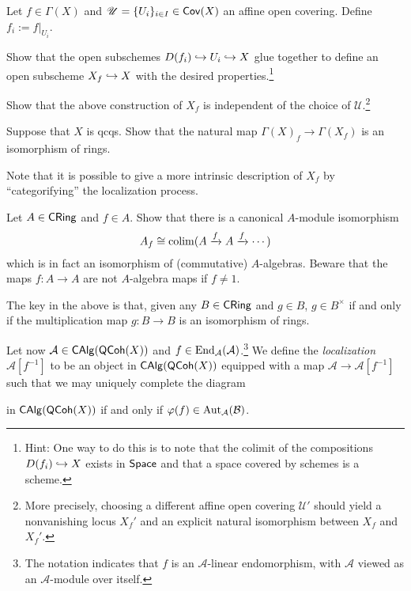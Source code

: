 \documentclass[11pt]{article}
\renewcommand{\AA}{\mathcal{A}}
\newcommand{\BB}{\mathcal{B}}
\renewcommand{\phi}{\varphi}
\newcommand{\U}{\mathscr{U}}
\begin{document}
\begin{exercise}
Let $f\in\Gamma(X)$ and $\U=\{U_i\}_{i\in I}\in\Cov(X)$ an affine open covering. Define $f_i:=f|_{U_i}$. 
\begin{enum}{\alph}
\item Show that the open subschemes $D(f_i)\hookrightarrow U_i\hookrightarrow X$ glue together to define an open subscheme $X_f\hookrightarrow X$ with the desired properties.\footnote{Hint: One way to do this is to note that the colimit of the compositions $D(f_i)\hookrightarrow X$ exists in $\operatorname{\mathsf{Space}}$ and that a space covered by schemes is a scheme.}

\item Show that the above construction of $X_f$ is independent of the choice of $\U$.\footnote{More precisely, choosing a different affine open covering $\U'$ should yield a nonvanishing locus $X_f'$ and an explicit natural isomorphism between $X_f$ and $X_f'$.}

\item Suppose that $X$ is qcqs. Show that the natural map $\Gamma(X)_f\to\Gamma(X_f)$ is an isomorphism of rings.
\end{enum}
\end{exercise}

Note that it is possible to give a more intrinsic description of $X_f$ by ``categorifying'' the localization process.

\begin{exercise}
Let $A\in\operatorname{\mathsf{CRing}}$ and $f\in A$. Show that there is a canonical $A$-module isomorphism
$$A_f\cong\operatorname{colim}(A\xrightarrow{f}A\xrightarrow{f}\cdots)$$
which is in fact an isomorphism of (commutative) $A$-algebras. Beware that the maps $f: A\to A$ are not $A$-algebra maps if $f\neq1$.
\end{exercise}

The key in the above is that, given any $B\in\operatorname{\mathsf{CRing}}$ and $g\in B$, $g\in B^{\times}$ if and only if the multiplication map $g: B\to B$ is an isomorphism of rings.

Let now $\AA\in\CAlg(\QCoh(X))$ and $f\in\End_{\AA}(\AA)$.\footnote{The notation indicates that $f$ is an $\AA$-linear endomorphism, with $\AA$ viewed as an $\AA$-module over itself.} We define the \emph{localization} $\AA[f^{-1}]$ to be an object in $\operatorname{\mathsf{CAlg}}(\operatorname{\mathsf{QCoh}}(X))$ equipped with a map $\AA\to\AA[f^{-1}]$ such that we may uniquely complete the diagram
\begin{center}
\end{center}
in $\operatorname{\mathsf{CAlg}}(\operatorname{\mathsf{QCoh}}(X))$ if and only if $\phi(f)\in\Aut_{\AA}(\BB)$.
\end{document}
